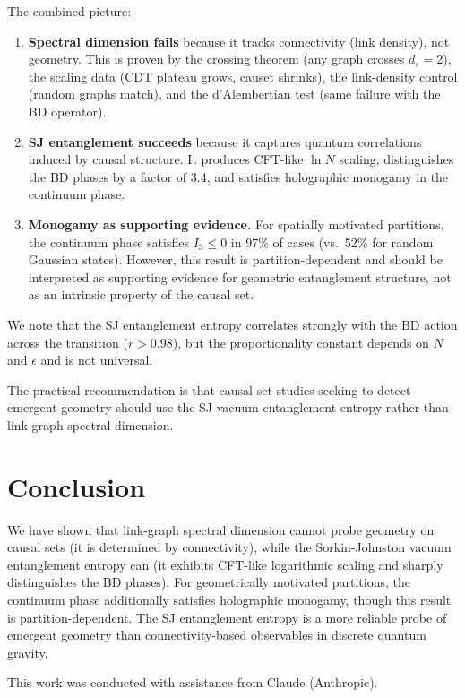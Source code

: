 \documentclass[aps,prd,twocolumn,superscriptaddress,nofootinbib]{revtex4-2}
\begin{document}
The combined picture:
\begin{enumerate}
\item \textbf{Spectral dimension fails} because it tracks connectivity (link density), not geometry. This is proven by the crossing theorem (any graph crosses $d_s = 2$), the scaling data (CDT plateau grows, causet shrinks), the link-density control (random graphs match), and the d'Alembertian test (same failure with the BD operator).
\item \textbf{SJ entanglement succeeds} because it captures quantum correlations induced by causal structure. It produces CFT-like $\ln N$ scaling, distinguishes the BD phases by a factor of 3.4, and satisfies holographic monogamy in the continuum phase.
\item \textbf{Monogamy as supporting evidence.} For spatially motivated partitions, the continuum phase satisfies $I_3 \leq 0$ in 97\% of cases (vs.\ 52\% for random Gaussian states). However, this result is partition-dependent and should be interpreted as supporting evidence for geometric entanglement structure, not as an intrinsic property of the causal set.
\end{enumerate}

We note that the SJ entanglement entropy correlates strongly with the BD action across the transition ($r > 0.98$), but the proportionality constant depends on $N$ and $\epsilon$ and is not universal.

The practical recommendation is that causal set studies seeking to detect emergent geometry should use the SJ vacuum entanglement entropy rather than link-graph spectral dimension.

\section{Conclusion}

We have shown that link-graph spectral dimension cannot probe geometry on causal sets (it is determined by connectivity), while the Sorkin-Johnston vacuum entanglement entropy can (it exhibits CFT-like logarithmic scaling and sharply distinguishes the BD phases). For geometrically motivated partitions, the continuum phase additionally satisfies holographic monogamy, though this result is partition-dependent. The SJ entanglement entropy is a more reliable probe of emergent geometry than connectivity-based observables in discrete quantum gravity.

\begin{acknowledgments}
This work was conducted with assistance from Claude (Anthropic).
\end{acknowledgments}
\end{document}
